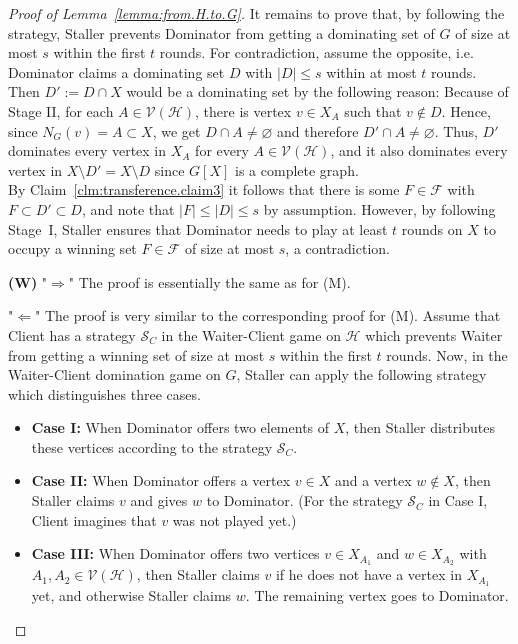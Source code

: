 \documentclass[reqno, 12pt]{amsart}
\numberwithin{equation}{section}
\numberwithin{figure}{section}
\newcommand{\calH}{\mathcal{H}}
\newcommand{\calF}{\mathcal{F}}
\newcommand{\calV}{\mathcal{V}}
\begin{document}
\begin{proof}[Proof of Lemma~\ref{lemma:from.H.to.G}]
It remains to prove that, by following the strategy, Staller 
prevents Dominator from getting a dominating set of $G$ 
of size at most $s$ within
the first $t$ rounds.
For contradiction, assume the opposite, i.e. 
Dominator claims a dominating set $D$ with $|D|\leq s$ within at most $t$ rounds.
Then $D' := D\cap X$ would be a dominating set by the following reason:
Because of Stage II, for each $A\in \mathcal{V}(\calH)$,
there is vertex $v\in X_A$ such that $v\notin D$.
Hence, since $N_G(v)=A\subset X$, 
we get $D\cap A \neq \varnothing$
and therefore $D'\cap A \neq \varnothing$. 
Thus, $D'$ dominates every vertex in $X_A$ for every $A\in \mathcal{V}(\calH)$,
and it also dominates every vertex in $X\setminus D' = X\setminus D$
since $G[X]$ is a complete graph. \\
By Claim~\ref{clm:transference.claim3}
it follows that there is some $F\in \calF$ with 
$F\subset D'\subset D$,
and note that $|F|\leq |D|\leq s$ by assumption. 
However, by following Stage~I, Staller ensures that Dominator needs to play at least $t$ rounds
on $X$ to occupy a winning set $F\in \calF$
of size at most $s$, a contradiction.

\medskip


\textbf{(W)} "$\Rightarrow$" The proof is essentially the same as for (M).

"$\Leftarrow$" The proof is very similar to the corresponding proof for (M).
Assume that Client has a strategy $\mathcal{S}_C$ in the 
Waiter-Client game on $\calH$ which prevents Waiter from 
getting a winning set of size at most $s$ 
within the first $t$ rounds. 
Now, in the Waiter-Client domination game on $G$,
Staller can apply the following strategy which distinguishes
three cases.
\begin{itemize}
\item[] \textbf{Case I:} When Dominator offers two elements of $X$,
then Staller distributes these vertices according to the strategy $\mathcal{S}_C$.
\item[] \textbf{Case II:} When Dominator offers a vertex $v\in X$ and a vertex $w \notin X$, then Staller claims $v$ and gives $w$ to 
Dominator. (For the strategy $\mathcal{S}_C$ in Case I, Client imagines that $v$ was not played yet.)
\item[] \textbf{Case III:} When Dominator offers two vertices 
$v\in X_{A_1}$ and $w\in X_{A_2}$ with $A_1,A_2\in \calV(\calH)$,
then Staller claims $v$ if he does not have a vertex in $X_{A_1}$ yet, and otherwise Staller claims $w$. The remaining vertex goes to Dominator.
\end{itemize}


\end{proof}
\end{document}
